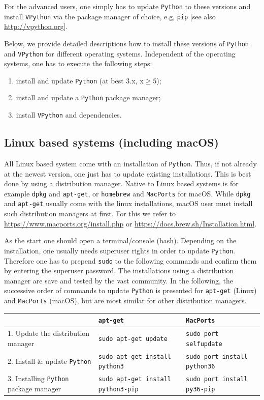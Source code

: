 \documentclass[12pt,ngerman,american]{iopart}
\newcommand{\python}[0]{\texttt{Python}}
\newcommand{\vpython}[0]{\texttt{VPython}}
\newcommand{\code}[1]{{\scriptsize\colorbox{light-gray}{\texttt{#1}}}}
\begin{document}
For the advanced users, one simply has to update \python{} to these versions and install \vpython{} via the package manager of choice, e.g, \texttt{pip} [see also \url{http://vpython.org}].

Below, we provide detailed descriptions how to install these versions of \python{} and \vpython{} for different operating systems.
Independent of the operating systems, one has to execute the following steps:
\begin{enumerate}
	\item install and update \python{} (at best 3.x, x$\geq5$);
	\item install and update a \python{} package manager;
	\item install \vpython{} and dependencies.
\end{enumerate}

\subsection{Linux based systems (including macOS)}\label{appendix:python-max}
All Linux based system come with an installation of \python{}.
Thus, if not already at the newest version, one just has to update existing installations.
This is best done by using a distribution manager.
Native to Linux based systems is for example \texttt{dpkg} and \texttt{apt-get}, or \texttt{homebrew} and \texttt{MacPorts} for macOS.
While \texttt{dpkg} and \texttt{apt-get} usually come with the linux installations, macOS user must install such distribution managers at first.
For this we refer to \url{https://www.macports.org/install.php} or \url{https://docs.brew.sh/Installation.html}.

As the start one should open a terminal/console (bash).
Depending on the installation, one usually needs superuser rights in order to update \python{}.
Therefore one has to prepend \code{sudo} to the following commands and confirm them by entering the superuser password.
The installations using a distribution manager are save and tested by the vast community.
In the following, the successive order of commands to update \python{} is presented for \texttt{apt-get} (Linux) and \texttt{MacPorts} (macOS), but are most similar for other distribution managers.
\begin{table}[h!]
\centering
\footnotesize
\begin{tabular}{l || l | l}
	& \texttt{apt-get} & \texttt{MacPorts} \\\hline
	1. Update the distribution manager & \code{sudo apt-get update} & \code{sudo port selfupdate} \\
	2. Install \& update \python{} & \code{sudo apt-get install python3} & \code{sudo port install python36} \\
	3. Installing \python{} package manager & \code{sudo apt-get install python3-pip} & \code{sudo port install py36-pip}
\end{tabular}
\normalsize
\end{table}
\end{document}
